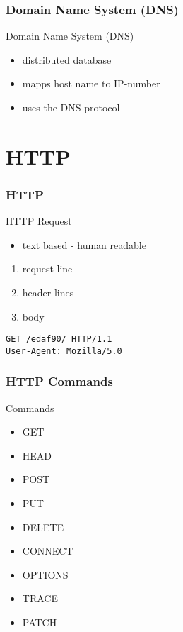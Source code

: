 \begin{frame}[fragile]\frametitle{Domain Name System (DNS)}
Domain Name System (DNS)
\begin{itemize}
  \item distributed database
  \item mapps host name to IP-number
  \item uses the DNS protocol
\end{itemize}
\end{frame}

\section{HTTP}
\begin{frame}[fragile]\frametitle{HTTP}
\color{structure}
HTTP Request
\begin{itemize}\color{structure}
  \item text based - human readable
\end{itemize}
\begin{enumerate}
  \item request line
  \item header lines
  \item body
\end{enumerate}
\vspace{5mm}
\noindent
\begin{verbatim}
GET /edaf90/ HTTP/1.1
User-Agent: Mozilla/5.0
\end{verbatim}
\end{frame}

\begin{frame}[fragile]\frametitle{HTTP Commands}
\color{structure}
Commands
\begin{itemize}\color{structure}
\item GET
\item HEAD
\item POST
\item PUT
\item DELETE
\item CONNECT
\item OPTIONS
\item TRACE
\item PATCH
\end{itemize}
\end{frame}

